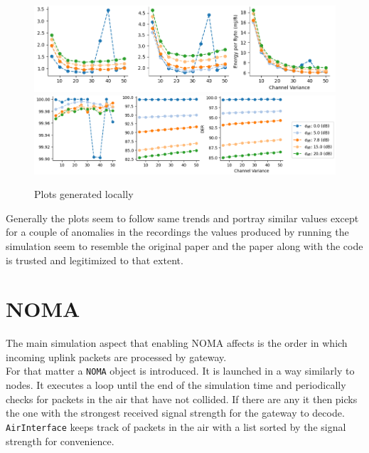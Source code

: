 \begin{figure}[H]
\centering
\includegraphics[scale=0.5]{figures/my_plots_1.PNG}\\
\hspace*{1.3cm}  
\includegraphics[scale=0.5]{figures/my_plots_2.PNG}
  \caption{Plots generated locally}
  \label{fig:my_sectors}
\end{figure}

Generally the plots seem to follow same trends and portray 
similar values except for a couple of anomalies in the
recordings the values produced by running the simulation
seem to resemble the original paper and the paper along with
the code is trusted and legitimized to that extent. 

\section{NOMA}
The main simulation aspect that enabling NOMA affects is the 
order in which incoming uplink packets are processed by 
gateway. \\

For that matter a \texttt{NOMA} object is introduced. It is 
launched in a way similarly to nodes. It executes a loop
until the end of the simulation time and periodically checks
for packets in the air that have not collided. If there are any
it then picks the one with the strongest received signal 
strength for the gateway to decode. \texttt{AirInterface} keeps
track of packets in the air with a list sorted by the signal
strength for convenience. 

